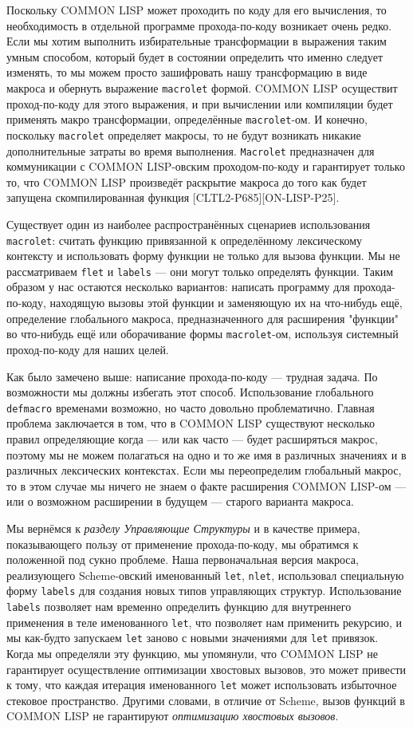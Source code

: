 Поскольку COMMON LISP может проходить по коду для его вычисления, то необходимость в отдельной программе прохода-по-коду возникает очень редко. Если мы хотим выполнить избирательные трансформации в выражения таким умным способом, который будет в состоянии определить что именно следует изменять, то мы можем просто зашифровать нашу трансформацию в виде макроса и обернуть выражение \verb"macrolet" формой. COMMON LISP осуществит проход-по-коду для этого выражения, и при вычислении или компиляции будет применять макро трансформации, определённые \verb"macrolet"-ом. И конечно, поскольку \verb"macrolet" определяет макросы, то не будут возникать никакие дополнительные затраты во время выполнения. \verb"Macrolet" предназначен для коммуникации с COMMON LISP-овским проходом-по-коду и гарантирует только то, что COMMON LISP произведёт раскрытие макроса до того как будет запущена скомпилированная функция [CLTL2-P685][ON-LISP-P25].

Существует один из наиболее распространённых сценариев использования \verb"macrolet": считать функцию привязанной к определённому лексическому контексту и использовать форму функции не только для вызова функции. Мы не рассматриваем \verb"flet" и \verb"labels" --- они могут только определять функции. Таким образом у нас остаются несколько вариантов: написать программу для прохода-по-коду, находящую вызовы этой функции и заменяющую их на что-нибудь ещё, определение глобального макроса, предназначенного для расширения "функции" во что-нибудь ещё или оборачивание формы \verb"macrolet"-ом, используя системный проход-по-коду для наших целей.

Как было замечено выше: написание прохода-по-коду --- трудная задача. По возможности мы должны избегать этот способ. Использование глобального \verb"defmacro" временами возможно, но часто довольно проблематично. Главная проблема заключается в том, что в COMMON LISP существуют несколько правил определяющие когда --- или как часто --- будет расширяться макрос, поэтому мы не можем полагаться на одно и то же имя в различных значениях и в различных лексических контекстах. Если мы переопределим глобальный макрос, то в этом случае мы ничего не знаем о факте расширения COMMON LISP-ом --- или о возможном расширении в будущем --- старого варианта макроса.

Мы вернёмся к \emph{разделу Управляющие Структуры} и в качестве примера, показывающего пользу от применение прохода-по-коду, мы обратимся к положенной под сукно проблеме. Наша первоначальная версия макроса, реализующего Scheme-овский именованный \verb"let", \verb"nlet", использовал специальную форму \verb"labels" для создания новых типов управляющих структур. Использование \verb"labels" позволяет нам временно определить функцию для внутреннего применения в теле именованного \verb"let", что позволяет нам применить рекурсию, и мы как-будто запускаем \verb"let" заново с новыми значениями для \verb"let" привязок. Когда мы определяли эту функцию, мы упомянули, что COMMON LISP не гарантирует осуществление оптимизации хвостовых вызовов, это может привести к тому, что каждая итерация именованного \verb"let" может использовать избыточное стековое пространство. Другими словами, в отличие от Scheme, вызов функций в COMMON LISP не гарантируют \emph{оптимизацию хвостовых вызовов}.

